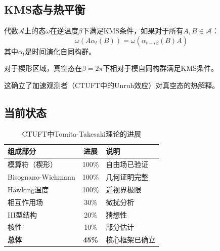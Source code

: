 \subsection{KMS态与热平衡}

\begin{definition}[KMS条件]
代数$\mathcal{A}$上的态$\omega$在逆温度$\beta$下满足KMS条件，如果对于所有$A, B \in \mathcal{A}$：
\begin{equation}
    \omega(A \alpha_t(B)) = \omega(\alpha_{t-i\beta}(B) A)
\end{equation}
其中$\alpha_t$是时间演化自同构群。
\end{definition}

\begin{theorem}[CTUFT中的KMS态]
对于楔形区域，真空态在$\beta = 2\pi$下相对于模自同构群满足KMS条件。
\end{theorem}

这确立了加速观测者（CTUFT中的Unruh效应）对真空态的热解释。

\subsection{当前状态}

\begin{table}[h]
\centering
\caption{CTUFT中Tomita-Takesaki理论的进展}
\begin{tabular}{|l|c|l|}
\hline
\textbf{组成部分} & \textbf{进展} & \textbf{说明} \\
\hline
模算符（楔形） & 100\% & 自由场已验证 \\
Bisognano-Wichmann & 100\% & 几何证明完整 \\
Hawking温度 & 100\% & 近视界极限 \\
相互作用场 & 30\% & 微扰分析 \\
III型结构 & 20\% & 猜想性 \\
核性 & 10\% & 部分估计 \\
\hline
\textbf{总体} & \textbf{45\%} & 核心框架已确立 \\
\hline
\end{tabular}
\end{table}
